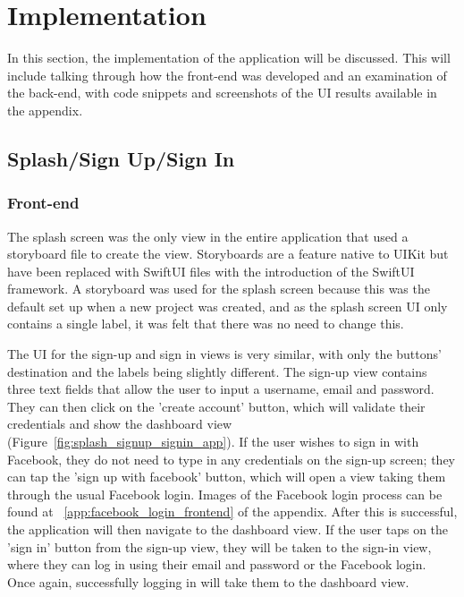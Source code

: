     \section{Implementation}
    \label{sec:deliverables_implementation}
        In this section, the implementation of the application will be discussed. This will include talking through how the front-end was developed and an examination of the back-end, with code snippets and screenshots of the UI results available in the appendix.
        
        \subsection{Splash/Sign Up/Sign In}
        \subsubsection{Front-end}
        The splash screen was the only view in the entire application that used a storyboard file to create the view.  Storyboards are a feature native to UIKit but have been replaced with SwiftUI files with the introduction of the SwiftUI framework.  A storyboard was used for the splash screen because this was the default set up when a new project was created, and as the splash screen UI only contains a single label, it was felt that there was no need to change this.
        
        The UI for the sign-up and sign in views is very similar, with only the buttons' destination and the labels being slightly different. The sign-up view contains three text fields that allow the user to input a username, email and password. They can then click on the 'create account' button, which will validate their credentials and show the dashboard view (Figure~\ref{fig:splash_signup_signin_app}). If the user wishes to sign in with Facebook, they do not need to type in any credentials on the sign-up screen; they can tap the 'sign up with facebook' button, which will open a view taking them through the usual Facebook login. Images of the Facebook login process can be found at ~\ref{app:facebook_login_frontend} of the appendix.  After this is successful, the application will then navigate to the dashboard view. If the user taps on the 'sign in' button from the sign-up view, they will be taken to the sign-in view, where they can log in using their email and password or the Facebook login. Once again, successfully logging in will take them to the dashboard view.
        
        
        
